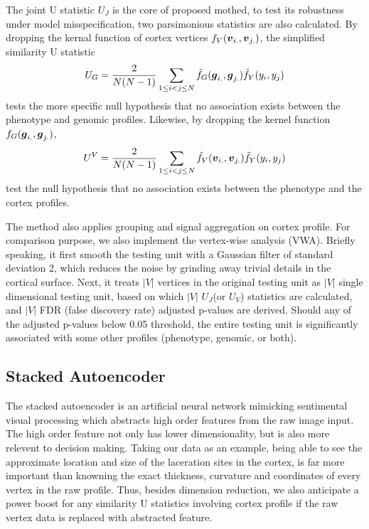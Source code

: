 {The joint U statistic $U_J$ is the core of proposed mothed, to test its robustness under model misspecification, two parsimonious statistics are also calculated. By dropping the kernal function of cortex vertices $f_V(\boldsymbol{v}_{i.}, \boldsymbol{v}_{j.})$, the simplified similarity U statistic
\[ U_G = \frac{2}{N(N-1)} \sum_{1 \leq i < j \leq N}^{} \tilde{f}_G(\boldsymbol{g}_{i.}, \boldsymbol{g}_{j.}) \tilde{f}_Y(y_i, y_j) \]
tests the more specific null hypothesis that no association exists between the phenotype and genomic profiles. Likewise, by dropping the kernel function $f_G(\boldsymbol{g}_{i.}, \boldsymbol{g}_{j.})$, 
\[ U^V = \frac{2}{N(N-1)} \sum_{1 \leq i < j \leq N}^{} \tilde{f}_V(\boldsymbol{v}_{i.}, \boldsymbol{v}_{j.}) \tilde{f}_Y(y_i, y_j) \]
test the null hypothesis that no association exists between the phenotype and the cortex profiles.

The method also applies grouping and signal aggregation on cortex profile. For comparison purpose, we also implement the vertex-wise analysis (VWA). Briefly speaking, it first smooth the testing unit with a Gaussian filter of standard deviation 2, which reduces the noise by grinding away trivial details in the cortical surface. Next, it treats $|V|$ vertices in the original testing unit as $|V|$ single dimensional testing unit, based on which $|V|$ $U_J$(or $U_V$) statistics are calculated, and $|V|$ FDR (false discovery rate) adjusted p-values are derived. Should any of the adjusted p-values below 0.05 threshold, the entire testing unit is significantly associated with some other profiles (phenotype, genomic, or both).

\subsection{Stacked Autoencoder}
The stacked autoencoder is an artificial neural network mimicking sentimental visual processing which abstracts high order features from the raw image input. The high order feature not only has lower dimensionality, but is also more relevent to decision making. Taking our data as an example, being able to see the approximate location and size of the laceration sites in the cortex, is far more important than knowning the exact thickness, curvature and coordinates of every vertex in the raw profile. Thus, besides dimension reduction, we also anticipate a power boost for any similarity U statistics involving cortex profile if the raw vertex data is replaced with abstracted feature.

}
